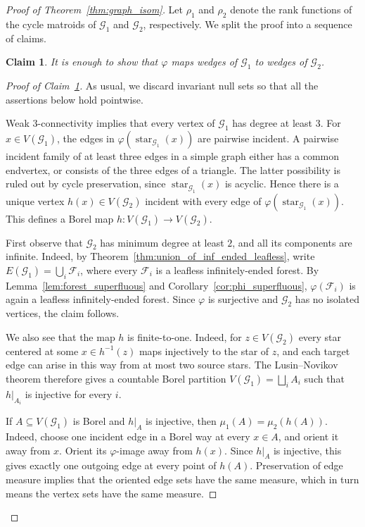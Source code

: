 \documentclass{article}
\theoremstyle{plain}
\newtheorem{cl}[thm]{Claim}
\theoremstyle{definition}
\newcommand{\cG}{\mathcal{G}}
\newcommand{\cF}{\mathcal{F}}
\newcommand{\fg}{\varphi}
\begin{document}
\begin{proof}[Proof of Theorem~\ref{thm:graph_isom}]
    Let $\rho_1$ and $\rho_2$ denote the rank functions of the cycle matroids of $\cG_1$ and $\cG_2$, respectively. We split the proof into a sequence of claims.
    \begin{cl}\label{lem:w_to_w}
        It is enough to show that $\fg$ maps wedges of $\cG_1$ to wedges of $\cG_2$.
    \end{cl}


\begin{proof}[Proof of Claim~\ref{lem:w_to_w}]
As usual, we discard invariant null sets so that all the assertions below hold pointwise.

Weak $3$-connectivity implies that every vertex of $\cG_1$ has degree at least $3$. For $x\in V(\cG_1)$, the edges in $\varphi(\operatorname{star}_{\cG_1}(x))$ are pairwise incident. A pairwise incident family of at least three edges in a simple graph either has a common endvertex, or consists of the three edges of a triangle. The latter possibility is ruled out by cycle preservation, since $\operatorname{star}_{\cG_1}(x)$ is acyclic. Hence there is a unique vertex $h(x)\in V(\cG_2)$ incident with every edge of $\varphi(\operatorname{star}_{\cG_1}(x))$. This defines a Borel map $h:V(\cG_1)\to V(\cG_2)$.

First observe that $\cG_2$ has minimum degree at least $2$, and all its components are infinite. Indeed, by Theorem~\ref{thm:union_of_inf_ended_leafless}, write $E(\cG_1)=\bigcup_i \cF_i$, where every $\cF_i$ is a leafless infinitely-ended forest. By Lemma~\ref{lem:forest_superfluous} and Corollary~\ref{cor:phi_superfluous}, $\varphi(\cF_i)$ is again a leafless infinitely-ended forest. Since $\varphi$ is surjective and $\cG_2$ has no isolated vertices, the claim follows.

We also see that the map $h$ is finite-to-one. Indeed, for $z\in V(\cG_2)$ every star centered at some $x\in h^{-1}(z)$ maps injectively to the star of $z$, and each target edge can arise in this way from at most two source stars. The Lusin--Novikov theorem therefore gives a countable Borel partition $V(\cG_1)=\bigsqcup_i A_i$ such that $h|_{A_i}$ is injective for every $i$.

If $A\subseteq V(\cG_1)$ is Borel and $h|_A$ is injective, then $\mu_1(A)=\mu_2(h(A))$. Indeed, choose one incident edge in a Borel way at every $x\in A$, and orient it away from $x$. Orient its $\varphi$-image away from $h(x)$. Since $h|_A$ is injective, this gives exactly one outgoing edge at every point of $h(A)$. Preservation of edge measure implies that the oriented edge sets have the same measure, which in turn means the vertex sets have the same measure. 


\end{proof}
\end{proof}
\end{document}
